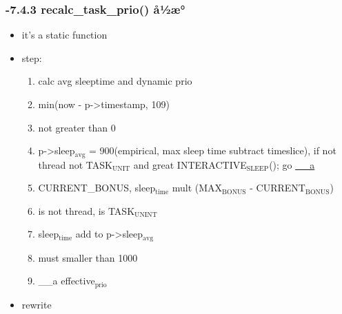 \documentclass[11pt]{article}
\begin{document}
\subsubsection{-7.4.3 recalc\_task\_prio() å½æ°}
\label{sec-2.4.3}

\begin{itemize}
\item it's a static function
\item step:

\begin{enumerate}
\item calc avg sleeptime and dynamic prio
\item min(now - p->timestamp, 109)
\item not greater than 0
\item p->sleep$_{\mathrm{avg}}$ = 900(empirical, max sleep time subtract timeslice), if not
     thread not TASK$_{\mathrm{UNIT}}$ and great INTERACTIVE$_{\mathrm{SLEEP}}$(); go \hyperref[sec-2.4.3]{__a}
\item CURRENT\_BONUS, sleep$_{\mathrm{time}}$ mult (MAX$_{\mathrm{BONUS}}$ - CURRENT$_{\mathrm{BONUS}}$)
\item is not thread, is TASK$_{\mathrm{UNINT}}$
\item sleep$_{\mathrm{time}}$ add to p->sleep$_{\mathrm{avg}}$
\item must smaller than 1000
\item __a effective$_{\mathrm{prio}}$
\end{enumerate}

\item rewrite
\end{itemize}
\end{document}
